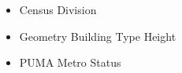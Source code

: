 \begin{itemize}
\item Census Division
\item Geometry Building Type Height
\item PUMA Metro Status
\end{itemize}
